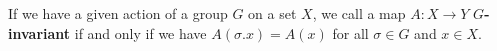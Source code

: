 \begin{definition}
  If we have a given action of a group $G$ on a set $X$, we call a map $A \colon X \rightarrow Y$ \textbf{$G$-invariant} if and only if we have $A(\sigma.x) = A(x)$ for all $\sigma \in G$ and $x \in X$.
\end{definition}
